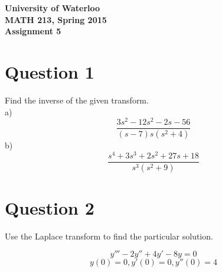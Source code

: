 \documentclass[12pt]{article}
\begin{document}
\begin{center}
{\Large\bf University of Waterloo}\\
\vspace{3mm}
{\Large\bf MATH 213, Spring 2015}\\
\vspace{2mm}
{\Large\bf Assignment 5}\\
\end{center}

\section*{Question 1}

Find the inverse of the given transform. \\

\noindent
a) $$\frac{3s^2 - 12s^2 - 2s - 56}{(s-7)s(s^2+4)}$$
b) $$\frac{s^4 + 3s^3 + 2s^2 + 27s + 18}{s^3(s^2+9)}$$

\section*{Question 2}

Use the Laplace transform to find the particular solution.

$$y''' - 2y'' + 4y' - 8y = 0$$
$$y(0) = 0, y'(0) = 0, y''(0) = 4$$
\end{document}
